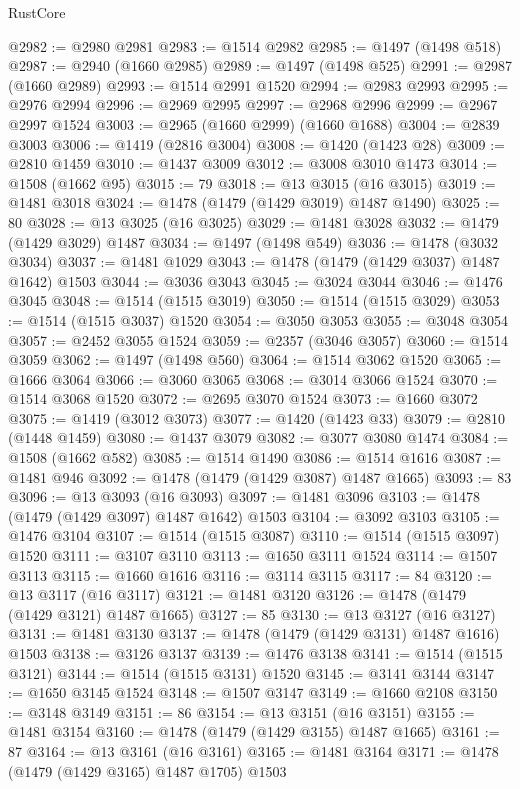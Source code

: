 \begin{lexlean}{RustCore}
\begin{coremodule}
@2982 := @2980 @2981
@2983 := @1514 @2982
@2985 := @1497 (@1498 @518)
@2987 := @2940 (@1660 @2985)
@2989 := @1497 (@1498 @525)
@2991 := @2987 (@1660 @2989)
@2993 := @1514 @2991 @1520
@2994 := @2983 @2993
@2995 := @2976 @2994
@2996 := @2969 @2995
@2997 := @2968 @2996
@2999 := @2967 @2997 @1524
@3003 := @2965 (@1660 @2999) (@1660 @1688)
@3004 := @2839 @3003
@3006 := @1419 (@2816 @3004)
@3008 := @1420 (@1423 @28)
@3009 := @2810 @1459
@3010 := @1437 @3009
@3012 := @3008 @3010 @1473
@3014 := @1508 (@1662 @95)
@3015 := 79
@3018 := @13 @3015 (@16 @3015)
@3019 := @1481 @3018
@3024 := @1478 (@1479 (@1429 @3019) @1487 @1490)
@3025 := 80
@3028 := @13 @3025 (@16 @3025)
@3029 := @1481 @3028
@3032 := @1479 (@1429 @3029) @1487
@3034 := @1497 (@1498 @549)
@3036 := @1478 (@3032 @3034)
@3037 := @1481 @1029
@3043 := @1478 (@1479 (@1429 @3037) @1487 @1642) @1503
@3044 := @3036 @3043
@3045 := @3024 @3044
@3046 := @1476 @3045
@3048 := @1514 (@1515 @3019)
@3050 := @1514 (@1515 @3029)
@3053 := @1514 (@1515 @3037) @1520
@3054 := @3050 @3053
@3055 := @3048 @3054
@3057 := @2452 @3055 @1524
@3059 := @2357 (@3046 @3057)
@3060 := @1514 @3059
@3062 := @1497 (@1498 @560)
@3064 := @1514 @3062 @1520
@3065 := @1666 @3064
@3066 := @3060 @3065
@3068 := @3014 @3066 @1524
@3070 := @1514 @3068 @1520
@3072 := @2695 @3070 @1524
@3073 := @1660 @3072
@3075 := @1419 (@3012 @3073)
@3077 := @1420 (@1423 @33)
@3079 := @2810 (@1448 @1459)
@3080 := @1437 @3079
@3082 := @3077 @3080 @1474
@3084 := @1508 (@1662 @582)
@3085 := @1514 @1490
@3086 := @1514 @1616
@3087 := @1481 @946
@3092 := @1478 (@1479 (@1429 @3087) @1487 @1665)
@3093 := 83
@3096 := @13 @3093 (@16 @3093)
@3097 := @1481 @3096
@3103 := @1478 (@1479 (@1429 @3097) @1487 @1642) @1503
@3104 := @3092 @3103
@3105 := @1476 @3104
@3107 := @1514 (@1515 @3087)
@3110 := @1514 (@1515 @3097) @1520
@3111 := @3107 @3110
@3113 := @1650 @3111 @1524
@3114 := @1507 @3113
@3115 := @1660 @1616
@3116 := @3114 @3115
@3117 := 84
@3120 := @13 @3117 (@16 @3117)
@3121 := @1481 @3120
@3126 := @1478 (@1479 (@1429 @3121) @1487 @1665)
@3127 := 85
@3130 := @13 @3127 (@16 @3127)
@3131 := @1481 @3130
@3137 := @1478 (@1479 (@1429 @3131) @1487 @1616) @1503
@3138 := @3126 @3137
@3139 := @1476 @3138
@3141 := @1514 (@1515 @3121)
@3144 := @1514 (@1515 @3131) @1520
@3145 := @3141 @3144
@3147 := @1650 @3145 @1524
@3148 := @1507 @3147
@3149 := @1660 @2108
@3150 := @3148 @3149
@3151 := 86
@3154 := @13 @3151 (@16 @3151)
@3155 := @1481 @3154
@3160 := @1478 (@1479 (@1429 @3155) @1487 @1665)
@3161 := 87
@3164 := @13 @3161 (@16 @3161)
@3165 := @1481 @3164
@3171 := @1478 (@1479 (@1429 @3165) @1487 @1705) @1503

\end{coremodule}
\end{lexlean}
